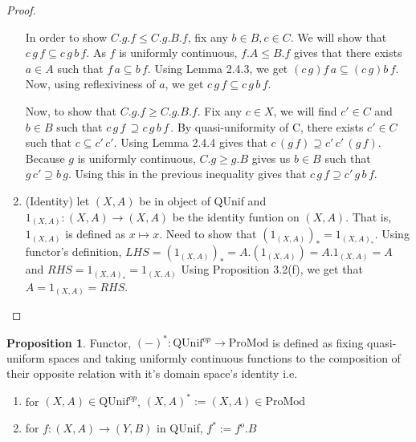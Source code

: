 \documentclass[18pt,a4paper]{article}
\theoremstyle{definition}
\newtheorem{proop}[theorem]{Proposition}
\begin{document}
\begin{proof}
\begin{enumerate}[label=(\roman*)]
	In order to show $C.g.f \leq C.g.B.f$, fix any $b\in B, c\in C$.
			We will show that $c\,g\,f \subseteq c\,g\,b\,f$. As $f$ is uniformly
			continuous, $f.A \leq B.f$ gives that there exists $a \in A$ such that
			$f\,a \subseteq b\,f$. Using Lemma 2.4.3, we get $(c\,g)f\,a \subseteq
			(c\,g)b\,f$. Now, using reflexiviness of $a$, we get $c\,g\,f \subseteq
			c\,g\,b\,f$.

			Now, to show that $C.g.f \geq C.g.B.f$. Fix any $c \in X$, we will find $c' \in C$ and
			$b \in B$ such that $c\, g\, f\, \supseteq c\, g\, b\, f\, $. By quasi-uniformity of C,
			there exists $c' \in C$ such that $c \subseteq  c'\, c'$. Using Lemma 2.4.4
			gives that $c\, (g\, f)\supseteq c'\, c'\, (g\, f) $. Because $g$ is uniformly
			continuous, $C.g \geq g.B$ gives us $b\in B$ such that $g\, c' \supseteq b\, g$.
			Using this in the previous inequality gives that $c\, g\, f \supseteq c'\, g\, b\, f$.

			\item(Identity) let $(X,A)$ be in object of QUnif and
				$1_{(X,A)}:(X,A)\to(X,A)$ be the identity funtion on $(X,A)$. That is,
				$1_{(X,A)}$ is defined as $x\mapsto x$.
				Need to show that $(1_{(X,A)})_*=1_{(X,A)_*}$. Using
				functor's definition, $LHS=(1_{(X,A)})_*=A.(1_{(X,A)})=A.1_{(X,A)}=A$
				and $RHS=1_{(X,A)_*}=1_{(X,A)}$
				Using Proposition 3.2(f), we get that $A=1_{(X,A)}=RHS$. \qedhere
		\end{enumerate}
\end{proof}
\begin{proop} Functor, $(-)^*:\text{QUnif}^{op} \to \text{ProMod}$ is
	defined as fixing quasi-uniform spaces and taking
	uniformly continuous functions to the composition of their opposite
	relation with it's domain space's identity i.e.
	\begin{enumerate}[label=(\alph*)]
		\item for $(X,A) \in \text{QUnif}^{op}$, $(X,A)^*:=(X,A) \in \text{ProMod}$
		\item for $f:(X,A) \to (Y,B)$ in QUnif,
			$f^* := f^o .B$
	\end{enumerate}
\end{proop}
\end{document}
